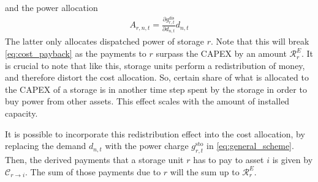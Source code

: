 \documentclass[11pt,twocolumn]{article}
\newcommand{\pdv}[2]{\frac{\partial #1}{\partial #2}}
\newcommand{\storage}{g_{r,t}}
\newcommand{\storagedispatch}{\storage^\text{dis}}
\newcommand{\storagecharge}{\storage^\text{sto}}
\newcommand{\demand}[1][n]{d_{#1,t}}
\newcommand{\cost}{\mathcal{C}}
\newcommand{\capexstorage}{\mathcal{C}^E}
\newcommand{\remainingcost}{\mathcal{R}}
\newcommand{\allocatestoragedispatch}[1][r, n]{A_{#1,t}}
\newcommand{\allocatecapexstorage}[1][n \rightarrow r]{\capexstorage_{#1,t}}
\begin{document}
and the power allocation 
\begin{align}
    \allocatestoragedispatch = \pdv{\storagedispatch}{\demand} \demand
\end{align}
The latter only allocates dispatched power of storage $r$. Note that this will break \cref{eq:cost_payback} as the payments to $r$ surpass the CAPEX by an amount $\remainingcost^E_r$. 
It is crucial to note that like this, storage units perform a redistribution of money, and therefore distort the cost allocation. So, certain share of what is allocated to the CAPEX of a storage is in another time step spent by the storage in order to buy power from other assets. This effect scales with the amount of installed capacity.

It is possible to incorporate this redistribution effect into the cost allocation, by replacing the demand $\demand$ with the power charge $\storagecharge$ in \cref{eq:general_scheme}. Then, the derived payments that a storage unit $r$ has to pay to asset $i$ is given by $\cost_{r \rightarrow i}$. The sum of those payments due to $r$ will the sum up to $\remainingcost^E_r$. 

\end{document}
